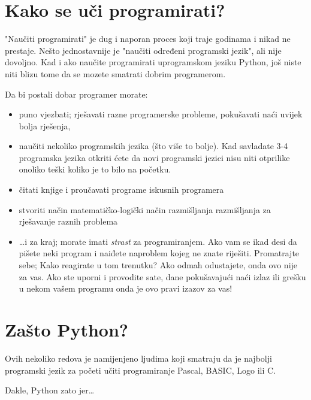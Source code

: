 \section*{Kako se uči programirati?}

	"Naučiti programirati" je dug i naporan proces koji traje godinama i nikad ne
	prestaje. Nešto jednostavnije je "naučiti određeni programski jezik",
	ali nije dovoljno. Kad i ako naučite programirati uprogramskom jeziku Python,
	još niste niti blizu tome da se mozete smatrati dobrim programerom.

	Da bi postali dobar programer morate:
	\begin{itemize}
		\item puno vjezbati; rješavati razne programerske probleme, 
			pokušavati naći uvijek bolja rješenja,
		\item naučiti nekoliko programskih jezika (što više to bolje). 
			Kad savladate 3-4 programska jezika otkriti ćete da novi programski
			jezici nisu niti otprilike onoliko teški koliko je to bilo na
			početku.
		\item čitati knjige i proučavati programe iskusnih programera
		\item stvoriti način matematičko-logički način razmišljanja
			razmišljanja za rješavanje raznih problema
		\item \dots i za kraj; morate imati \emph{strast} za programiranjem. Ako vam se
			ikad desi da pišete neki program i naiđete naproblem kojeg ne znate
			riješiti. Promatrajte sebe; Kako reagirate u tom trenutku? Ako odmah
			odustajete, onda ovo nije za vas. Ako ste uporni i provodite sate, dane 
			pokušavajući naći izlaz ili grešku u nekom vašem programu
			onda je ovo pravi izazov za vas!
	\end{itemize}

\section*{Zašto Python?}

	Ovih nekoliko redova je namijenjeno ljudima koji smatraju da je najbolji programski
	jezik za početi učiti programiranje Pascal, BASIC, Logo ili C.

	Dakle, Python zato jer\dots

